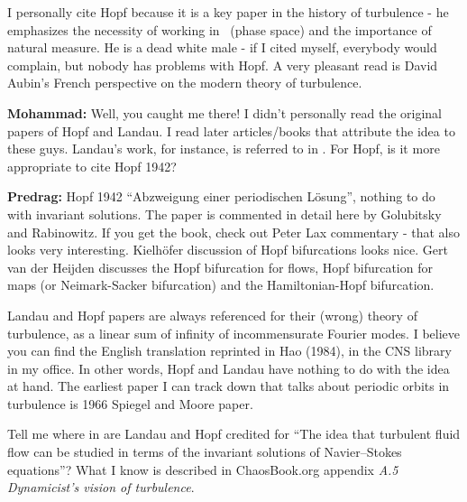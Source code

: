\begin{description}
{I personally cite Hopf because it is a key paper in
the history of turbulence - he emphasizes the necessity of working in
\statesp\ (phase space) and the importance of natural measure.
He is a dead white male - if I
cited myself, everybody would complain, but nobody has problems with Hopf.
A very pleasant read is
{David Aubin}'s French perspective on the modern theory of turbulence.

{\bf Mohammad:} Well, you caught me there! I didn't personally read
the original papers of Hopf and Landau. I read later articles/books
that attribute the idea to these guys. Landau's work, for instance,
is referred to in . For Hopf, is it more appropriate
to cite Hopf 1942?

{\bf Predrag:} Hopf 1942 ``Abzweigung einer periodischen
L\"osung'', nothing to do with invariant solutions. The paper
is commented in detail
 {here} by
Golubitsky and Rabinowitz. If you get the book, check out Peter Lax
commentary - that also looks very interesting.
Kielh\"ofer discussion of Hopf bifurcations looks nice.
 {Gert van der Heijden}
discusses the Hopf bifurcation for flows, Hopf bifurcation for maps (or
Neimark-Sacker bifurcation) and the Hamiltonian-Hopf bifurcation.

Landau and Hopf papers are always referenced for
their (wrong)
{theory of turbulence}, as a linear sum of infinity of incommensurate
Fourier modes. I believe you can find the English translation
reprinted in Hao (1984), in the CNS library in my office.
In other words, Hopf and Landau have nothing to do with
the idea at hand. The earliest paper I can track down that talks about
periodic orbits in turbulence is
1966 Spiegel and Moore paper.

Tell me where in  are Landau and Hopf credited for ``The
idea that turbulent fluid flow can be studied in terms of the invariant
solutions of Navier--Stokes equations''? What I know is described in
ChaosBook.org appendix \emph{A.5 Dynamicist's vision of turbulence}.
    }

\end{description}
